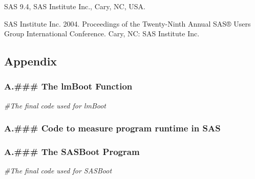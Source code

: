 \documentclass[]{article}
\newenvironment{Shaded}{\begin{snugshade}}{\end{snugshade}}
\newcommand{\KeywordTok}[1]{\textcolor[rgb]{0.13,0.29,0.53}{\textbf{#1}}}
\newcommand{\FloatTok}[1]{\textcolor[rgb]{0.00,0.00,0.81}{#1}}
\newcommand{\StringTok}[1]{\textcolor[rgb]{0.31,0.60,0.02}{#1}}
\newcommand{\CommentTok}[1]{\textcolor[rgb]{0.56,0.35,0.01}{\textit{#1}}}
\newcommand{\OperatorTok}[1]{\textcolor[rgb]{0.81,0.36,0.00}{\textbf{#1}}}
\newcommand{\ErrorTok}[1]{\textcolor[rgb]{0.64,0.00,0.00}{\textbf{#1}}}
\newcommand{\NormalTok}[1]{#1}
\begin{document}
SAS 9.4, SAS Institute Inc., Cary, NC, USA.

SAS Institute Inc. 2004. Proceedings of the Twenty-Ninth Annual SAS®
Users Group International Conference. Cary, NC: SAS Institute Inc.

\pagebreak 

\subsection{Appendix}\label{appendix}

\subsubsection{A.\#\#\# The lmBoot
Function}\label{a.-the-lmboot-function}

\begin{Shaded}
\begin{Highlighting}[]
\CommentTok{#The final code used for lmBoot}
\end{Highlighting}
\end{Shaded}

\subsubsection{A.\#\#\# Code to measure program runtime in
SAS}\label{a.-code-to-measure-program-runtime-in-sas}

\begin{Shaded}
\end{Shaded}

\subsubsection{A.\#\#\# The SASBoot
Program}\label{a.-the-sasboot-program}

\begin{Shaded}
\begin{Highlighting}[]
\CommentTok{#The final code used for SASBoot}
\end{Highlighting}
\end{Shaded}
\end{document}
